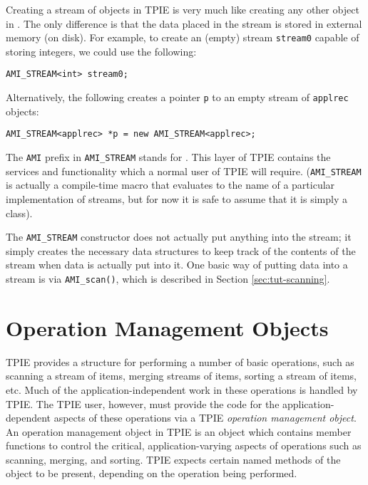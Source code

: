 Creating a stream of objects in TPIE is very much like creating any
other object in \CPP{}. The only difference is that the data placed in
the stream is stored in external memory (on disk).
For example, to create an (empty) stream \lstinline|stream0| capable
of storing integers, we could use the following:
\begin{lstlisting}
AMI_STREAM<int> stream0;
\end{lstlisting}
Alternatively, the following creates a pointer
\lstinline|p| to an empty stream of \lstinline|applrec| objects:
\begin{lstlisting}
AMI_STREAM<applrec> *p = new AMI_STREAM<applrec>;
\end{lstlisting}

The \lstinline|AMI| prefix in \lstinline|AMI_STREAM| stands for
. This layer of TPIE contains the services and
functionality which a normal user of TPIE will require.
(\lstinline|AMI_STREAM| is actually a compile-time macro that
evaluates to the name of a particular implementation of streams, but
for now it is safe to assume that it is simply a \CPP{} class).

The \lstinline|AMI_STREAM| constructor does not actually put anything
into the stream; it simply creates the necessary data structures to
keep track of the contents of the stream when data is actually put
into it.  One basic way of putting data into a stream is via
\lstinline|AMI_scan()|, which is described in Section
\ref{sec:tut-scanning}.


\section{Operation Management Objects} 

TPIE provides a
structure for performing a number of basic operations, such as
scanning a stream of items, merging streams of items, sorting a stream
of items, etc. Much of the application-independent work in these
operations is handled by TPIE.  The TPIE user, however, must provide
the code for the application-dependent aspects of these operations via
a TPIE {\em operation management object}. An operation management
object in TPIE is an object which contains member functions to control
the critical, application-varying aspects of operations such as
scanning, merging, and sorting. TPIE expects certain named methods of
the object to be present, depending on the operation being performed.


